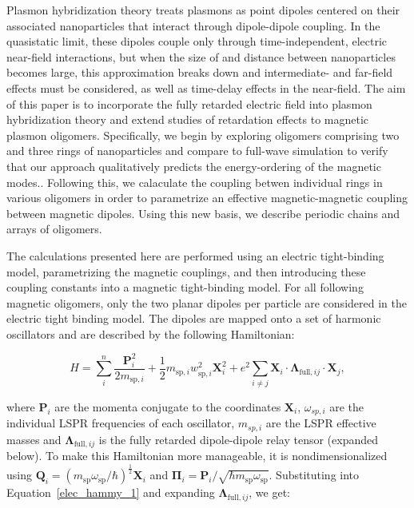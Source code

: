 \documentclass[journal=apchd5,manuscript=article]{achemso}
\begin{document}
Plasmon hybridization theory treats plasmons as point dipoles centered on their associated nanoparticles that interact through dipole-dipole coupling. In the quasistatic limit, these dipoles couple only through time-independent, electric near-field interactions\cite{jackson_classical_1999}, but when the size of and distance between nanoparticles becomes large, this approximation breaks down and intermediate- and far-field effects must be considered, as well as time-delay effects in the near-field\cite{jackson_classical_1999}. The aim of this paper is to incorporate the fully retarded electric field into plasmon hybridization theory and extend studies of retardation effects to magnetic plasmon oligomers. Specifically, we begin by exploring oligomers comprising two and three rings of nanoparticles and compare to full-wave simulation \cite{Hohenester2012} to verify that our approach qualitatively predicts the energy-ordering of the magnetic modes.\cite{Cherqui2014,Cherqui2016}. Following this, we calaculate the coupling betwen individual rings in various oligomers in order to parametrize an effective magnetic-magnetic coupling between magnetic dipoles. Using this new basis, we describe periodic chains and arrays of oligomers.

The calculations presented here are performed using an electric tight-binding model, parametrizing the magnetic couplings, and then introducing these coupling constants into a magnetic tight-binding model. For all following magnetic oligomers, only the two planar dipoles per particle are considered in the electric tight binding model. The dipoles are mapped onto a set of harmonic oscillators and are described by the following Hamiltonian:

\begin{equation}
H = \sum_{i}^{n}\frac{\textbf{P}_{i}^{2}}{2m_{\textrm{sp},i}} + \frac{1}{2}m_{\textrm{sp},i}w_{\textrm{sp},i}^2\textbf{X}_{i}^{2} + e^2\sum_{i\neq j}\textbf{X}_i\cdot\boldsymbol{\Lambda}_{\textrm{full},ij}\cdot\textbf{X}_j,\label{elec_hammy_1}
\end{equation}

where $\textbf{P}_i$ are the momenta conjugate to the coordinates $\textbf{X}_{i}$, $\omega_{sp,i}$ are the individual LSPR frequencies of each oscillator, $m_{sp,i}$ are the LSPR effective masses and $\boldsymbol{\Lambda}_{\textrm{full},ij}$ is the fully retarded dipole-dipole relay tensor (expanded below). To make this Hamiltonian more manageable, it is nondimensionalized using $\textbf{Q}_i = \left(m_{\textrm{sp}}\omega_{\textrm{sp}}/\hbar\right)^{\frac{1}{2}}\textbf{X}_i$ and $\boldsymbol{\Pi}_i = \textbf{P}_i/\sqrt{\hbar m_{\textrm{sp}}\omega_{\textrm{sp}}}$. Substituting into Equation~\ref{elec_hammy_1} and expanding $\boldsymbol{\Lambda}_{\textrm{full},ij}$, we get:
\end{document}
